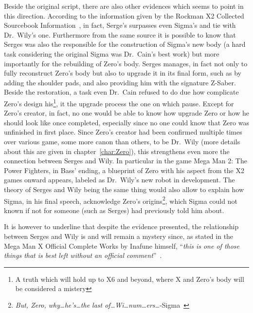 Beside the original script, there are also other evidences which seems to point in this direction. According to the information given by the Rockman X2 Collected Sourcebook Information~\cite{wayback:X2_resources}, in fact, Serge's surpasses even Sigma's and tie with Dr.~Wily's one. Furthermore from the same source it is possible to know that Serges was also the responsible for the construction of Sigma's new body (a hard task considering the original Sigma was Dr.~Cain's best work) but more importantly for the rebuilding of Zero's body. Serges manages, in fact not only to fully reconstruct Zero's body but also to upgrade it in its final form, such as by adding the shoulder pads, and also providing him with the signature Z-Saber. Beside the restoration, a task even Dr.~Cain refused to do due how complicate Zero's design his\footnote{A truth which will hold up to X6 and beyond, where X and Zero's body will be considered a mistery}, it the upgrade process the one on which pause. Except for Zero's creator, in fact, no one would be able to know how upgrade Zero or how he should look like once completed, especially since no one could know that Zero was unfinished in first place. Since Zero's creator had been confirmed multiple times over various game, some more canon than others, to be Dr.~Wily (more details about this are given in chapter~\ref{char:Zero}), this strengthens even more the connection between Serges and Wily. In particular in the game Mega Man 2: The Power Fighters, in Bass' ending, a blueprint of Zero with his aspect from the X2 games onward appears, labeled as Dr.~Wily's new robot in development.  The theory of Serges and Wily being the same thing would also allow to explain how Sigma, in his final speech, acknowledge Zero's origins\footnote{\textit{But, Zero, why…he’s…the last of…Wi…num…ers…}-Sigma~\cite{wayback:X2_resources}}, which Sigma could not known if not for someone (such as Serges) had previously told him about.

It is however to underline that despite the evidence presented, the relationship between Serges and Wily is and will remain a mystery since, as stated in the Mega Man X Official Complete Works by Inafune himself, ``\textit{this is one of those things that is best left without an official comment}''~\cite{book:MMX_Complete_art}.
